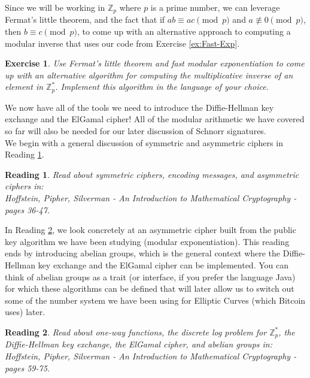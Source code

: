 \documentclass[12pt]{article}
\newcommand{\Z}[0]{\mathbb{Z}}
\newtheorem{exercise}{Exercise}
\newtheorem{reading}{Reading}
\theoremstyle{definition}
\theoremstyle{remark}
\theoremstyle{definition}
\begin{document}
Since we will be working in $\Z_p$ where $p$ is a prime number, we can leverage Fermat's little theorem, and the fact that if $ab\equiv ac\pmod p$ and $a\not\equiv 0\pmod p$, then $b\equiv c\pmod p$, to come up with an alternative approach to computing a modular inverse that uses our code from Exercise \ref{ex:Fast-Exp}.

\begin{exercise}\label{ex:prime-inverse}
Use Fermat’s little theorem and fast modular exponentiation to come up with an alternative algorithm for computing the multiplicative inverse of an element in $\Z_p^*$. Implement this algorithm in the language of your choice.
\end{exercise}

We now have all of the tools we need to introduce the Diffie-Hellman key exchange and the ElGamal cipher! All of the modular arithmetic we have covered so far will also be needed for our later discussion of Schnorr signatures.\\

We begin with a general discussion of symmetric and asymmetric ciphers in Reading \ref{ciphers}.

\begin{reading}\label{ciphers}
Read about symmetric ciphers, encoding messages, and asymmetric ciphers in:\\
Hoffstein, Pipher, Silverman - An Introduction to Mathematical Cryptography - pages 36-47.
\end{reading}

In Reading \ref{DH-crypto}, we look concretely at an asymmetric cipher built from the public key algorithm we have been studying (modular exponentiation). This reading ends by introducing abelian groups, which is the general context where the Diffie-Hellman key exchange and the ElGamal cipher can be implemented. You can think of abelian groups as a trait (or interface, if you prefer the language Java) for which these algorithms can be defined that will later allow us to switch out some of the number system we have been using for Elliptic Curves (which Bitcoin uses) later.

\begin{reading}\label{DH-crypto}
Read about one-way functions, the discrete log problem for $\Z_p^*$, the Diffie-Hellman key exchange, the ElGamal cipher, and abelian groups in:\\
Hoffstein, Pipher, Silverman - An Introduction to Mathematical Cryptography - pages 59-75.
\end{reading}
\end{document}
